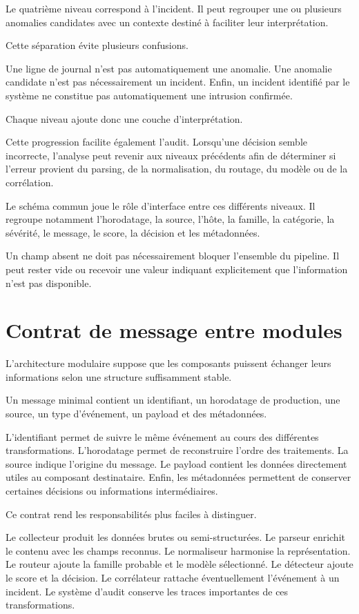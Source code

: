 Le quatrième niveau correspond à l'incident. Il peut regrouper une ou plusieurs anomalies candidates avec un contexte destiné à faciliter leur interprétation.

Cette séparation évite plusieurs confusions.

Une ligne de journal n'est pas automatiquement une anomalie. Une anomalie candidate n'est pas nécessairement un incident. Enfin, un incident identifié par le système ne constitue pas automatiquement une intrusion confirmée.

Chaque niveau ajoute donc une couche d'interprétation.

Cette progression facilite également l'audit. Lorsqu'une décision semble incorrecte, l'analyse peut revenir aux niveaux précédents afin de déterminer si l'erreur provient du parsing, de la normalisation, du routage, du modèle ou de la corrélation.

Le schéma commun joue le rôle d'interface entre ces différents niveaux. Il regroupe notamment l'horodatage, la source, l'hôte, la famille, la catégorie, la sévérité, le message, le score, la décision et les métadonnées.

Un champ absent ne doit pas nécessairement bloquer l'ensemble du pipeline. Il peut rester vide ou recevoir une valeur indiquant explicitement que l'information n'est pas disponible.

\section{Contrat de message entre modules}

L'architecture modulaire suppose que les composants puissent échanger leurs informations selon une structure suffisamment stable.

Un message minimal contient un identifiant, un horodatage de production, une source, un type d'événement, un payload et des métadonnées.

L'identifiant permet de suivre le même événement au cours des différentes transformations. L'horodatage permet de reconstruire l'ordre des traitements. La source indique l'origine du message. Le payload contient les données directement utiles au composant destinataire. Enfin, les métadonnées permettent de conserver certaines décisions ou informations intermédiaires.

Ce contrat rend les responsabilités plus faciles à distinguer.

Le collecteur produit les données brutes ou semi-structurées. Le parseur enrichit le contenu avec les champs reconnus. Le normaliseur harmonise la représentation. Le routeur ajoute la famille probable et le modèle sélectionné. Le détecteur ajoute le score et la décision. Le corrélateur rattache éventuellement l'événement à un incident. Le système d'audit conserve les traces importantes de ces transformations.

